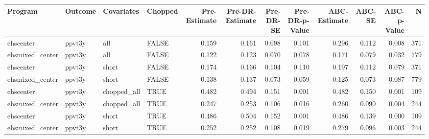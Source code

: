 \begin{table}[ht]
\centering
\begin{tabular}{llllrrrrrrrr}
  \hline
Program & Outcome & Covariates & Chopped & Pre-Estimate & Pre-DR-Estimate & Pre-DR-SE & Pre-DR-p-Value & ABC-Estimate & ABC-SE & ABC-p-Value & N \\ 
  \hline
ehscenter & ppvt3y & all & FALSE & 0.159 & 0.161 & 0.098 & 0.101 & 0.296 & 0.112 & 0.008 & 371 \\ 
  ehsmixed\_center & ppvt3y & all & FALSE & 0.122 & 0.123 & 0.070 & 0.078 & 0.171 & 0.079 & 0.032 & 779 \\ 
  ehscenter & ppvt3y & short & FALSE & 0.174 & 0.166 & 0.104 & 0.110 & 0.197 & 0.112 & 0.079 & 371 \\ 
  ehsmixed\_center & ppvt3y & short & FALSE & 0.138 & 0.137 & 0.073 & 0.059 & 0.125 & 0.073 & 0.087 & 779 \\ 
  ehscenter & ppvt3y & chopped\_all & TRUE & 0.482 & 0.494 & 0.151 & 0.001 & 0.482 & 0.150 & 0.001 & 109 \\ 
  ehsmixed\_center & ppvt3y & chopped\_all & TRUE & 0.247 & 0.253 & 0.106 & 0.016 & 0.260 & 0.090 & 0.004 & 244 \\ 
  ehscenter & ppvt3y & short & TRUE & 0.486 & 0.504 & 0.152 & 0.001 & 0.486 & 0.139 & 0.000 & 109 \\ 
  ehsmixed\_center & ppvt3y & short & TRUE & 0.252 & 0.252 & 0.108 & 0.019 & 0.279 & 0.096 & 0.003 & 244 \\ 
   \hline
\end{tabular}
\end{table}

